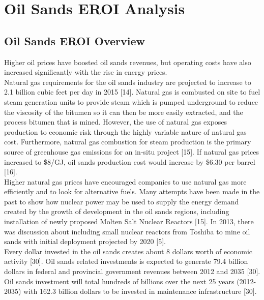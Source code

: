 \documentclass[11pt]{article}
\begin{document}

\section{Oil Sands EROI Analysis}

\subsection{Oil Sands EROI Overview}

Higher oil prices have boosted oil sands revenues, but operating costs have also increased significantly with the rise in energy prices. \\

Natural gas requirements for the oil sands industry are projected to increase to 2.1 billion cubic feet per day in 2015 [14]. Natural gas is combusted on site to fuel steam generation units to provide steam which is pumped underground to reduce the viscosity of the bitumen so it can then be more easily extracted, and the process bitumen that is mined. However, the use of natural gas exposes production to economic risk through the highly variable nature of natural gas cost. Furthermore, natural gas combustion for steam production is the primary source of greenhouse gas emissions for an in-situ project [15]. If natural gas prices increased to \$8/GJ, oil sands production cost would increase by \$6.30 per barrel [16].\\ 

Higher natural gas prices have encouraged companies to use natural gas more efficiently and to look for alternative fuels.  Many attempts have been made in the past to show how nuclear power may be used to supply the energy demand created by the growth of development in the oil sands regions, including installation of newly proposed Molten Salt Nuclear Reactors [15]. In 2013, there was discussion about including small nuclear reactors from Toshiba to mine oil sands with initial deployment projected by 2020 [5].\\

Every dollar invested in the oil sands creates about 8 dollars worth of economic activity [30]. Oil sands related investments is expected to generate 79.4 billion dollars in federal and provincial government revenues between 2012 and 2035 [30]. Oil sands investment will total hundreds of billions over the next 25 years (2012-2035) with 162.3 billion dollars to be invested in maintenance infrastructure [30]. \\
\end{document}
